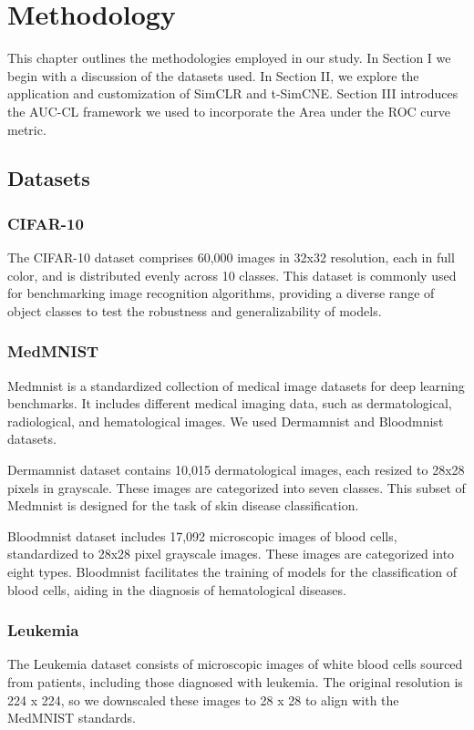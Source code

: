 \chapter{Methodology}

This chapter outlines the methodologies employed in our study. In Section I we begin with a discussion of the datasets used. In Section II, we explore the application and customization of SimCLR and t-SimCNE.
Section III introduces the AUC-CL framework we used to incorporate the Area under the ROC curve metric.

\section{Datasets}
\subsection{CIFAR-10}
The CIFAR-10 dataset \cite{cifar10} comprises 60,000 images in 32x32 resolution, each in full color, and is distributed evenly across 10 classes. This dataset is commonly used for benchmarking image recognition algorithms, providing a diverse range of object classes to test the robustness and generalizability of models.


\subsection{MedMNIST}
Medmnist \cite{medmnist} is a standardized collection of medical image datasets for deep learning benchmarks. It includes different medical imaging data, such as dermatological, radiological, and hematological images. We used Dermamnist and Bloodmnist datasets.

Dermamnist dataset contains 10,015 dermatological images, each resized to 28x28 pixels in grayscale. These images are categorized into seven classes. This subset of Medmnist is designed for the task of skin disease classification.

Bloodmnist dataset includes 17,092 microscopic images of blood cells, standardized to 28x28 pixel grayscale images. These images are categorized into eight types. Bloodmnist facilitates the training of models for the classification of blood cells, aiding in the diagnosis of hematological diseases.

\subsection{Leukemia}
The Leukemia dataset \cite{leukemia} consists of microscopic images of white blood cells sourced from patients, including those diagnosed with leukemia. The original resolution is 224 x 224, so we downscaled these images to 28 x 28 to align with the MedMNIST standards.


